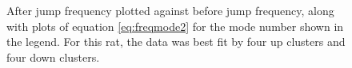 \documentclass[twocolumn, prl]{revtex4}
\begin{document}
\begin{figure}
\begin{center}

\caption{\label{fig:jumps}After jump frequency plotted against before jump frequency, along with plots of equation \ref{eq:freqmode2} for the mode number shown in the legend. For this rat, the data was best fit by four up clusters and four down clusters.} \end{center}
\end{figure}
\end{document}
